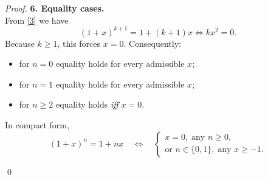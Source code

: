 \begin{proof}
\medskip\noindent\textbf{6. Equality cases.}\\
From \eqref{3} we have
\[
(1+x)^{k+1}=1+(k+1)x \iff kx^{2}=0 .
\]
Because $k\ge1$, this forces $x=0$.  
Consequently:
\begin{itemize}
\item for $n=0$ equality holds for every admissible $x$;
\item for $n=1$ equality holds for every admissible $x$;
\item for $n\ge2$ equality holds \emph{iff} $x=0$.
\end{itemize}
In compact form,
\[
(1+x)^{n}=1+n x \quad\Longleftrightarrow\quad
\begin{cases}
x=0,\; \text{any }n\ge0,\\[2pt]
\text{or } n\in\{0,1\},\; \text{any }x\ge-1 .
\end{cases}
\]

\qed
\end{proof}